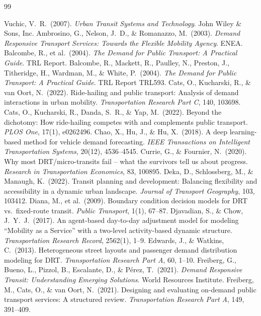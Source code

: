 \documentclass[12pt]{article}
\begin{document}
\begin{thebibliography}{99}

 Vuchic, V.\ R.\ (2007). \textit{Urban Transit Systems and Technology}. John Wiley \& Sons, Inc.
 Ambrosino, G., Nelson, J.\ D., \& Romanazzo, M.\ (2003). \textit{Demand Responsive Transport Services: Towards the Flexible Mobility Agency}. ENEA.
 Balcombe, R., et al.\ (2004). \textit{The Demand for Public Transport: A Practical Guide}. TRL Report.
 Balcombe, R., Mackett, R., Paulley, N., Preston, J., Titheridge, H., Wardman, M., \& White, P.\ (2004). \textit{The Demand for Public Transport: A Practical Guide}. TRL Report TRL593.
 Cats, O., Kucharski, R., \& van Oort, N.\ (2022). Ride-hailing and public transport: Analysis of demand interactions in urban mobility. \textit{Transportation Research Part C}, 140, 103698.
 Cats, O., Kucharski, R., Danda, S.\ R., \& Yap, M.\ (2022). Beyond the dichotomy: How ride-hailing competes with and complements public transport. \textit{PLOS One}, 17(1), e0262496.
 Chao, X., Hu, J., \& Hu, X.\ (2018). A deep learning-based method for vehicle demand forecasting. \textit{IEEE Transactions on Intelligent Transportation Systems}, 20(12), 4536--4545.
 Currie, G., \& Fournier, N.\ (2020). Why most DRT/micro-transits fail -- what the survivors tell us about progress. \textit{Research in Transportation Economics}, 83, 100895.
 Deka, D., Schlossberg, M., \& Manaugh, K.\ (2022). Transit planning and development: Balancing flexibility and accessibility in a dynamic urban landscape. \textit{Journal of Transport Geography}, 103, 103412.
 Diana, M., et al.\ (2009). Boundary condition decision models for DRT vs.\ fixed-route transit. \textit{Public Transport}, 1(1), 67--87.
 Djavadian, S., \& Chow, J.\ Y.\ J.\ (2017). An agent-based day-to-day adjustment model for modeling ``Mobility as a Service'' with a two-level activity-based dynamic structure. \textit{Transportation Research Record}, 2562(1), 1--9.
 Edwards, J., \& Watkins, C.\ (2013). Heterogeneous street layouts and passenger demand distribution modeling for DRT. \textit{Transportation Research Part A}, 60, 1--10.
 Freiberg, G., Bueno, L., Pizzol, B., Escalante, D., \& P\'erez, T.\ (2021). \textit{Demand Responsive Transit: Understanding Emerging Solutions}. World Resources Institute.
 Freiberg, M., Cats, O., \& van Oort, N.\ (2021). Designing and evaluating on-demand public transport services: A structured review. \textit{Transportation Research Part A}, 149, 391--409.

\end{thebibliography}
\end{document}
